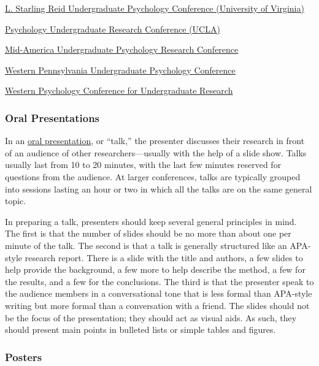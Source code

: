 \documentclass[
]{krantz}
\begin{document}
\href{https://psychology.as.virginia.edu/reid-conference}{L. Starling Reid Undergraduate Psychology Conference (University of Virginia)}

\href{https://purc.psych.ucla.edu/}{Psychology Undergraduate Research Conference (UCLA)}

\href{https://www.mauprc.org/}{Mid-America Undergraduate Psychology Research Conference}

\href{https://go.allegheny.edu/wpupc}{Western Pennsylvania Undergraduate Psychology Conference}

\href{https://www.stmarys-ca.edu/psychology/western-psychology-conference-for-undergraduate-research-wpcur}{Western Psychology Conference for Undergraduate Research}

\subsubsection*{Oral Presentations}\label{oral-presentations}


In an \hyperref[oral-presentation]{oral presentation}, or ``talk,'' the presenter discusses their research in front of an audience of other researchers---usually with the help of a slide show. Talks usually last from 10 to 20 minutes, with the last few minutes reserved for questions from the audience. At larger conferences, talks are typically grouped into sessions lasting an hour or two in which all the talks are on the same general topic.

In preparing a talk, presenters should keep several general principles in mind. The first is that the number of slides should be no more than about one per minute of the talk. The second is that a talk is generally structured like an APA-style research report. There is a slide with the title and authors, a few slides to help provide the background, a few more to help describe the method, a few for the results, and a few for the conclusions. The third is that the presenter speak to the audience members in a conversational tone that is less formal than APA-style writing but more formal than a conversation with a friend. The slides should not be the focus of the presentation; they should act as visual aids. As such, they should present main points in bulleted lists or simple tables and figures.

\subsubsection*{Posters}\label{posters}
\end{document}
